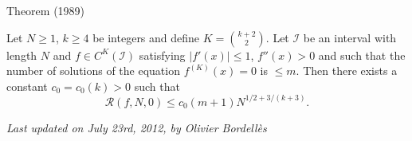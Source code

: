 \begin{thm}{Theorem (1989)}

Let $N \geqslant 1$, $k \geqslant 4$ be integers and define $K = \binom{k+2}{2}$. Let $\mathcal{I}$ be an interval with length $N$ and $f \in C^K (\mathcal{I})$ satisfying $|f'(x)| \leqslant 1$, $f''(x) >0$ and such that the number of solutions of the equation $f^{(K)} (x) = 0$ is $\leqslant m$. Then there exists a constant $c_0 = c_0(k) >0$ such that
$$\mathcal {R}(f,N,0) \leqslant c_0 (m+1) N^{1/2+3/(k+3)}.$$
\end{thm}











  
\begin{flushright}\small\sl{}   Last updated on July 23rd, 2012, by Olivier Bordell\`es
 \end{flushright}















